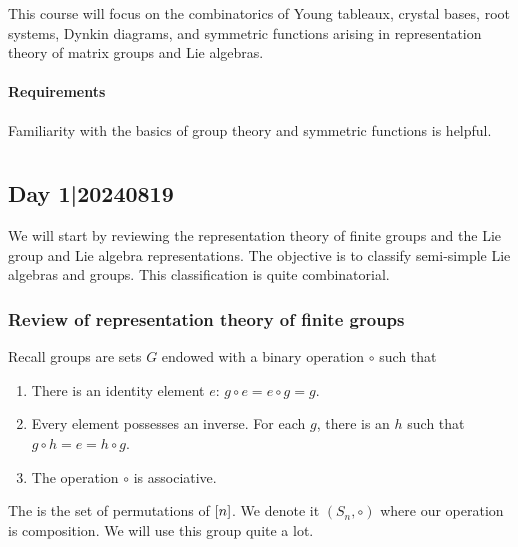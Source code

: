 \documentclass[12pt]{memoir}
\begin{document}
\maketitle
{\small 
\setlength{\parindent}{0em}
\setlength{\parskip}{1em}

This course will focus on the combinatorics of Young tableaux, crystal bases, root systems, Dynkin diagrams, and symmetric functions arising in representation theory of matrix groups and Lie algebras.

\subsubsection*{Requirements}
Familiarity with the basics of group theory and symmetric functions is helpful.
}
\newpage
\tableofcontents
\chapter{}

\section{Day 1|20240819}

We will start by reviewing the representation theory of finite groups and the Lie group and Lie algebra representations. The objective is to classify semi-simple Lie algebras and groups. This classification is quite combinatorial. 

\subsection{Review of representation theory of finite groups}

Recall groups are sets $G$ endowed with a binary operation $\circ$ such that 
\begin{enumerate}
    \item There is an identity element $e$: $g\circ e=e\circ g=g$.
    \item Every element possesses an inverse. For each $g$, there is an $h$ such that $g\circ h=e=h\circ g$.
    \item The operation $\circ$ is associative.
\end{enumerate}

\begin{Ex}
    The  is the set of permutations of $\left\lbrack n\right\rbrack$. We denote it $(S_n,\circ)$ where our operation is composition. We will use this group quite a lot.
\end{Ex}
\end{document}
